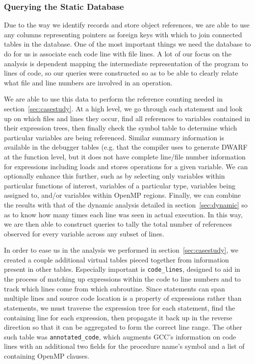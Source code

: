 \subsubsection{Querying the Static Database}
\label{sec:querying}
Due to the way we identify records and store object references, we are able to use any columns 
representing pointers as foreign keys with which to join connected tables in the database.
One of the most important things we need the database to do for us is associate each code line with 
file lines. A lot of our focus on the analysis is dependent mapping the intermediate representation of the program to lines of code, so our queries were 
constructed so as to be able to clearly relate what file and line numbers are involved in an operation.

We are able to use this data to perform the reference counting needed in 
section~\ref{sec:casestudy}.
At a high level, we go through each statement and look up on which files and lines they occur, find all 
references to variables contained in their expression trees, then finally check the symbol table to 
determine which particular variables are being referenced. Similar summary information is available in the debugger tables (e.g. that the compiler uses to generate DWARF at the function level, but it does not have complete line/file number information for expressions including loads and stores operations for a given variable. We can optionally enhance this further, such as by selecting only variables within particular functions 
of interest, variables of a particular type, variables being assigned to, and/or variables within 
OpenMP regions.
Finally, we can combine the results with that of the dynamic analysis detailed in 
section~\ref{sec:dynamic} so as to know how many times each line was seen in actual execution.
In this way, we are then able to construct queries to tally the total number of references observed for 
every variable across any subset of lines.

In order to ease us in the analysis we performed in section~\ref{sec:casestudy}, we created a couple 
additional virtual tables pieced together from information present in other tables.
Especially important is \texttt{code\_lines}, designed to aid in the process of matching up 
expressions within the code to line numbers and to track which lines come from which subroutine.
Since statements can span multiple lines and source code location is a property of expressions 
rather than statements, we must traverse the expression tree for each statement, find the containing 
line for each expression, then propagate it back up in the reverse direction so that it can be 
aggregated to form the correct line range.
The other such table was \texttt{annotated\_code}, which augments \acs{GCC}'s information on code 
lines with an additional two fields for the procedure name's symbol and a list of containing OpenMP 
clauses.


